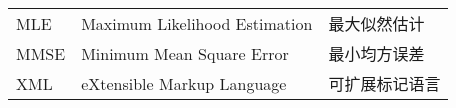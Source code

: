 \begin{supertabular}{lll}
MLE         & \hspace{0.5em}Maximum Likelihood Estimation             & \hspace{0.5em}最大似然估计 \\
MMSE        & \hspace{0.5em}Minimum Mean Square Error                 & \hspace{0.5em}最小均方误差 \\
XML         & \hspace{0.5em}eXtensible Markup Language                & \hspace{0.5em}可扩展标记语言 \\
\end{supertabular}
